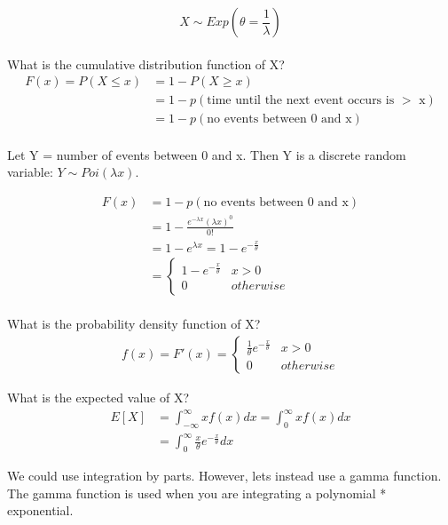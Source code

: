 \documentclass[12pt, letterpaper]{article}
\begin{document}
\begin{equation}
X \sim Exp(\theta = \frac{1}{\lambda})
\end{equation}\\

What is the cumulative distribution function of X?
\begin{align*}
F\left(x\right) = P\left(X \leq x\right) &= 1 - P\left(X \geq x\right)\\
&= 1 -  p\left(\text{time until the next event occurs is $>$ x}\right)\\
&= 1 -  p\left(\text{no events between 0 and x}\right)
\end{align*}\\

Let Y = number of events between 0 and x. Then Y is a discrete random variable: \(Y \sim Poi(\lambda x)\).

\begin{align*}
F\left(x\right) &= 1 -  p\left(\text{no events between 0 and x}\right)\\
&= 1 - \frac{e^{-\lambda x} (\lambda x)^0}{0!}\\
&= 1 - e^{\lambda x} = 1 - e^{- \frac{x}{\theta}}\\
&= 
	\begin{cases}
	1 - e^{- \frac{x}{\theta}} & x > 0\\
	0 & otherwise
	\end{cases}
\end{align*}\\

What is the probability density function of X?
\begin{align*}
f\left(x\right) = F' \left(x\right) =
	\begin{cases}
	\frac{1}{\theta} e^{-\frac{x}{\theta}} & x > 0\\
	0 & otherwise
	\end{cases}
\end{align*}

What is the expected value of X?
\begin{align*}
E[X] &= \int_{-\infty}^{\infty} x f\left(x\right) dx = \int_{0}^{\infty} x f\left(x\right) dx\\
&= \int_{0}^{\infty} \frac{x}{\theta} e^{-\frac{x}{\theta}} dx
\end{align*}

We could use integration by parts. However, lets instead use a gamma function. The gamma function is used when you are integrating a polynomial * exponential.\\
\end{document}
